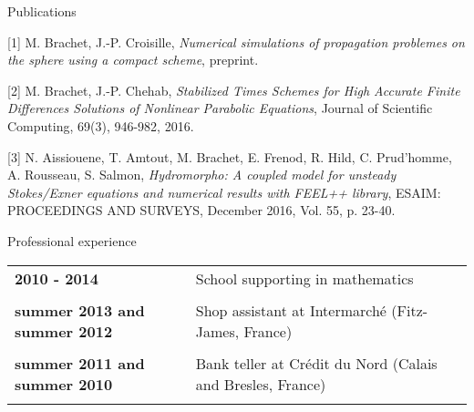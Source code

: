 \documentclass[10pt,a4paper]{report}
\begin{document}
\vspace{.4cm}
\noindent
{\selectfont
\begin{Large}
Publications
\end{Large}
\hrulefill
}
\vspace{0.5cm}

[1] {\sc  M. Brachet, J.-P. Croisille}, {\sl Numerical simulations of propagation problemes on the sphere using a compact scheme}, preprint.

\vspace{0.6cm}

[2] {\sc M. Brachet, J.-P. Chehab}, {\sl Stabilized Times Schemes for High Accurate Finite Differences Solutions of Nonlinear Parabolic Equations}, Journal of Scientific Computing, 69(3), 946-982, 2016.

\vspace{0.6cm}

[3] {\sc  N. Aissiouene, T. Amtout, M. Brachet, E. Frenod, R. Hild, C. Prud'homme, A. Rousseau, S. Salmon}, {\sl  Hydromorpho: A coupled model for unsteady Stokes/Exner equations and numerical results with FEEL++ library}, ESAIM: PROCEEDINGS AND SURVEYS, December 2016, Vol. 55, p. 23-40.






\vspace{.5cm}
\noindent
{\selectfont
\begin{Large}
Professional experience
\end{Large}
\hrulefill
}

\noindent
\begin{center}
\begin{tabular}{p{5cm} p{10cm}}
\textbf{2010 - 2014} & School supporting in mathematics\\

& \\

\textbf{summer 2013 and summer 2012} & Shop assistant at Intermarché (Fitz-James, France) \\

& \\

\textbf{summer 2011 and summer 2010} & Bank teller at Crédit du Nord (Calais and Bresles, France) \\

& \\

\end{tabular}
\end{center}
\end{document}

